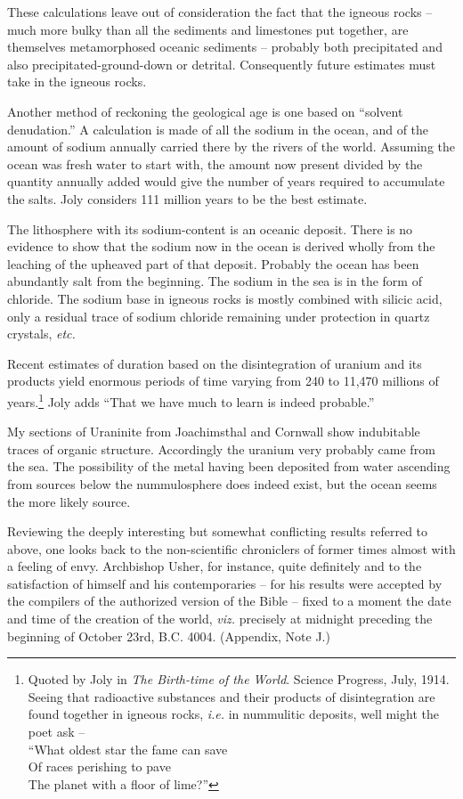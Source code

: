 \documentclass[a4paper, 12pt, oneside]{article}
\begin{document}
These calculations leave out of consideration the fact that the igneous rocks -- much more bulky than all the sediments and limestones put together, are themselves metamorphosed oceanic sediments -- probably both precipitated and also precipitated-ground-down or detrital. Consequently future estimates must take in the igneous rocks.

Another method of reckoning the geological age is one based on ``solvent denudation.'' A calculation is made of all the sodium in the ocean, and of the amount of sodium annually carried there by the rivers of the world. Assuming the ocean was fresh water to start with, the amount now present divided by the quantity annually added would give the number of years required to accumulate the salts. Joly considers 111 million years to be the best estimate.

The lithosphere with its sodium-content is an oceanic deposit. There is no evidence to show that the sodium now in the ocean is derived wholly from the leaching of the upheaved part of that deposit. Probably the ocean has been abundantly salt from the beginning. The sodium in the sea is in the form of chloride. The sodium base in igneous rocks is mostly combined with silicic acid, only a residual trace of sodium chloride remaining under protection in quartz crystals, \emph{etc.}

Recent estimates of duration based on the disintegration of uranium and its products yield enormous periods of time varying from 240 to 11,470 millions of years.\footnote{Quoted by Joly in \emph{The Birth-time of the World}. Science Progress, July, 1914. Seeing that radioactive substances and their products of disintegration are found together in igneous rocks, \emph{i.e.} in nummulitic deposits, well might the poet ask -- \\``What oldest star the fame can save\\Of races perishing to pave\\The planet with a floor of lime?''} Joly adds ``That we have much to learn is indeed probable.''

My sections of Uraninite from Joachimsthal and Cornwall show indubitable traces of organic structure. Accordingly the uranium very probably came from the sea. The possibility of the metal having been deposited from water ascending from sources below the nummulosphere does indeed exist, but the ocean seems the more likely source.

Reviewing the deeply interesting but somewhat conflicting results referred to above, one looks back to the non-scientific chroniclers of former times almost with a feeling of envy. Archbishop Usher, for instance, quite definitely and to the satisfaction of himself and his contemporaries -- for his results were accepted by the compilers of the authorized version of the Bible -- fixed to a moment the date and time of the creation of the world, \emph{viz.} precisely at midnight preceding the beginning of October 23rd, B.C. 4004. (Appendix, Note J.)
\end{document}
